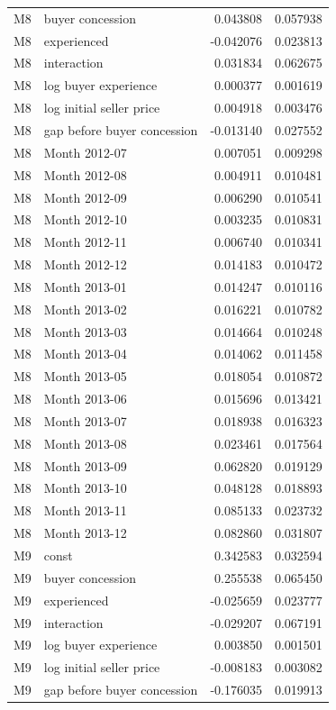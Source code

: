 \documentclass[11pt,a4paper]{article}
\begin{document}
\begin{longtable}{lp{8.4cm}rr}
M8 & buyer concession & 0.043808 & 0.057938 \\
M8 & experienced & -0.042076 & 0.023813 \\
M8 & interaction & 0.031834 & 0.062675 \\
M8 & log buyer experience & 0.000377 & 0.001619 \\
M8 & log initial seller price & 0.004918 & 0.003476 \\
M8 & gap before buyer concession & -0.013140 & 0.027552 \\
M8 & Month 2012-07 & 0.007051 & 0.009298 \\
M8 & Month 2012-08 & 0.004911 & 0.010481 \\
M8 & Month 2012-09 & 0.006290 & 0.010541 \\
M8 & Month 2012-10 & 0.003235 & 0.010831 \\
M8 & Month 2012-11 & 0.006740 & 0.010341 \\
M8 & Month 2012-12 & 0.014183 & 0.010472 \\
M8 & Month 2013-01 & 0.014247 & 0.010116 \\
M8 & Month 2013-02 & 0.016221 & 0.010782 \\
M8 & Month 2013-03 & 0.014664 & 0.010248 \\
M8 & Month 2013-04 & 0.014062 & 0.011458 \\
M8 & Month 2013-05 & 0.018054 & 0.010872 \\
M8 & Month 2013-06 & 0.015696 & 0.013421 \\
M8 & Month 2013-07 & 0.018938 & 0.016323 \\
M8 & Month 2013-08 & 0.023461 & 0.017564 \\
M8 & Month 2013-09 & 0.062820 & 0.019129 \\
M8 & Month 2013-10 & 0.048128 & 0.018893 \\
M8 & Month 2013-11 & 0.085133 & 0.023732 \\
M8 & Month 2013-12 & 0.082860 & 0.031807 \\
M9 & const & 0.342583 & 0.032594 \\
M9 & buyer concession & 0.255538 & 0.065450 \\
M9 & experienced & -0.025659 & 0.023777 \\
M9 & interaction & -0.029207 & 0.067191 \\
M9 & log buyer experience & 0.003850 & 0.001501 \\
M9 & log initial seller price & -0.008183 & 0.003082 \\
M9 & gap before buyer concession & -0.176035 & 0.019913 \\

\end{longtable}
\end{document}
